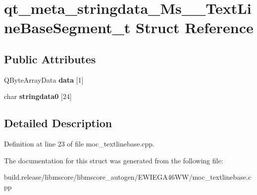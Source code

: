\hypertarget{structqt__meta__stringdata___ms_____text_line_base_segment__t}{}\section{qt\+\_\+meta\+\_\+stringdata\+\_\+\+Ms\+\_\+\+\_\+\+Text\+Line\+Base\+Segment\+\_\+t Struct Reference}
\label{structqt__meta__stringdata___ms_____text_line_base_segment__t}
\subsection*{Public Attributes}
\begin{DoxyCompactItemize}
\item 
\mbox{\label{structqt__meta__stringdata___ms_____text_line_base_segment__t_a2890f7db5fe364e9d596d705c03b94da}} 
Q\+Byte\+Array\+Data {\bfseries data} \mbox{[}1\mbox{]}
\item 
\mbox{\label{structqt__meta__stringdata___ms_____text_line_base_segment__t_a2515731e42941154cd0a8e9c1c796eaa}} 
char {\bfseries stringdata0} \mbox{[}24\mbox{]}
\end{DoxyCompactItemize}


\subsection{Detailed Description}


Definition at line 23 of file moc\+\_\+textlinebase.\+cpp.



The documentation for this struct was generated from the following file\+:\begin{DoxyCompactItemize}
\item 
build.\+release/libmscore/libmscore\+\_\+autogen/\+E\+W\+I\+E\+G\+A46\+W\+W/moc\+\_\+textlinebase.\+cpp\end{DoxyCompactItemize}
